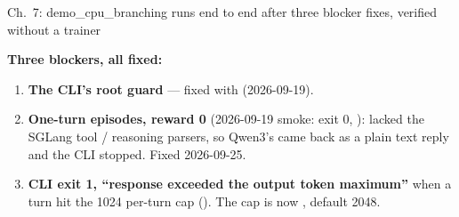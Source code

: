 \begin{frame}{Ch.\ 7: demo\_cpu\_branching runs end to end after three blocker fixes, verified without a trainer}
{\footnotesize\textbf{Three blockers, all fixed:}\par}
\begin{enumerate}\footnotesize\setlength{\itemsep}{1.8mm}
\item \textbf{The CLI's root guard} --- fixed with  (2026-09-19).
\item \textbf{One-turn episodes, reward 0} (2026-09-19 smoke: exit 0, ):  lacked the SGLang tool / reasoning parsers, so Qwen3's  came back as a plain  text reply and the CLI stopped. Fixed 2026-09-25.
\item \textbf{CLI exit 1, ``response exceeded the output token maximum''} when a turn hit the 1024 per-turn cap (). The cap is now , default 2048.
\end{enumerate}
\vspace{3mm}
\end{frame}

